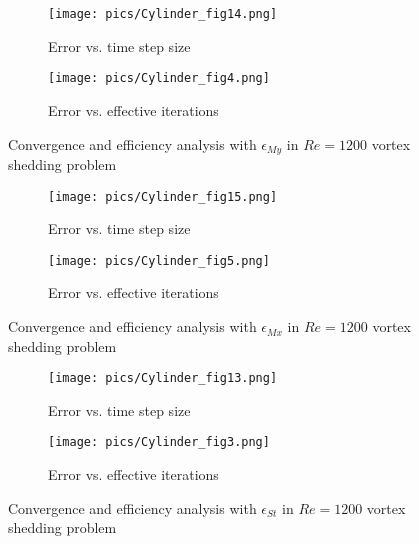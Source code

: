 \documentclass[preprint,12pt]{elsarticle}
\begin{document}
\begin{figure}[htbp]
    \centering
    \begin{subfigure}{0.5\textwidth}
        \texttt{[image: pics/Cylinder\_fig14.png]}
        \caption[]{Error vs. time step size}
        \label{sfig:CylinderRe1200_My_C}
    \end{subfigure}\hfill
    \begin{subfigure}{0.5\textwidth}
        \texttt{[image: pics/Cylinder\_fig4.png]}
        \caption[]{Error vs. effective iterations}
        \label{sfig:CylinderRe1200_My_E}
    \end{subfigure}
    \caption[]{Convergence and efficiency analysis with $\epsilon_{My}$ in $Re=1200$ vortex shedding problem}
    \label{fig:CylinderRe1200_My}
\end{figure}

\begin{figure}[htbp]
    \centering
    \begin{subfigure}{0.5\textwidth}
        \texttt{[image: pics/Cylinder\_fig15.png]}
        \caption[]{Error vs. time step size}
        \label{sfig:CylinderRe1200_Mx_C}
    \end{subfigure}\hfill
    \begin{subfigure}{0.5\textwidth}
        \texttt{[image: pics/Cylinder\_fig5.png]}
        \caption[]{Error vs. effective iterations}
        \label{sfig:CylinderRe1200_Mx_E}
    \end{subfigure}
    \caption[]{Convergence and efficiency analysis with $\epsilon_{Mx}$ in $Re=1200$ vortex shedding problem}
    \label{fig:CylinderRe1200_Mx}
\end{figure}

\begin{figure}[htbp]
    \centering
    \begin{subfigure}{0.5\textwidth}
        \texttt{[image: pics/Cylinder\_fig13.png]}
        \caption[]{Error vs. time step size}
        \label{sfig:CylinderRe1200_St_C}
    \end{subfigure}\hfill
    \begin{subfigure}{0.5\textwidth}
        \texttt{[image: pics/Cylinder\_fig3.png]}
        \caption[]{Error vs. effective iterations}
        \label{sfig:CylinderRe1200_St_E}
    \end{subfigure}
    \caption[]{Convergence and efficiency analysis with $\epsilon_{St}$ in $Re=1200$ vortex shedding problem}
    \label{fig:CylinderRe1200_St}
\end{figure}
\end{document}
